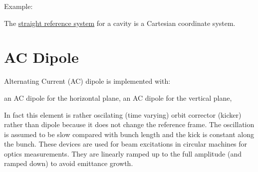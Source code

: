 Example:

The \hyperref[subsec:local-straight]{straight reference system} for a
cavity is a Cartesian coordinate system.






\section{AC Dipole}
\label{sec:acdipole}

Alternating Current (AC) dipole is implemented with:
\begin{madlist}
    an AC dipole for the horizontal plane,
    an AC dipole for the vertical plane,
\end{madlist}

In fact this element is rather oscilating (time varying) orbit corrector (kicker) rather than dipole
because it does not change the reference frame. The oscillation is assumed to be slow
compared with bunch length and the kick is constant along the bunch.
These devices are used for beam excitations in circular machines for optics measurements.
They are linearly ramped up to the full amplitude (and ramped down)
to avoid emittance growth.

